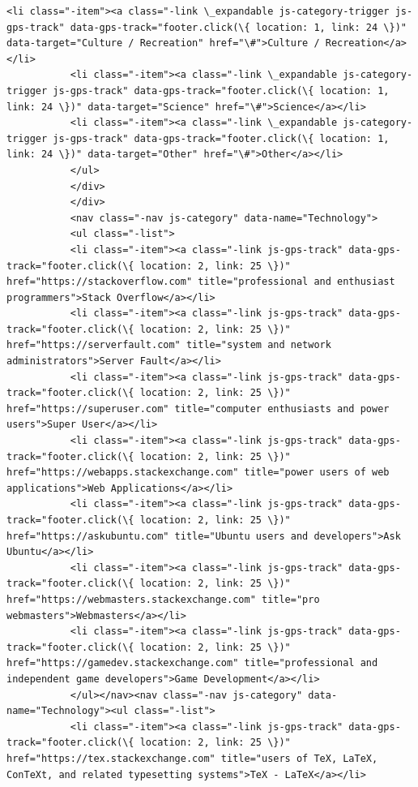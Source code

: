 \documentclass[11pt]{article}
\begin{document}
\begin{Verbatim}[commandchars=\\\{\}]
           <li class="-item"><a class="-link \_expandable js-category-trigger js-gps-track" data-gps-track="footer.click(\{ location: 1, link: 24 \})" data-target="Culture / Recreation" href="\#">Culture / Recreation</a></li>
           <li class="-item"><a class="-link \_expandable js-category-trigger js-gps-track" data-gps-track="footer.click(\{ location: 1, link: 24 \})" data-target="Science" href="\#">Science</a></li>
           <li class="-item"><a class="-link \_expandable js-category-trigger js-gps-track" data-gps-track="footer.click(\{ location: 1, link: 24 \})" data-target="Other" href="\#">Other</a></li>
           </ul>
           </div>
           </div>
           <nav class="-nav js-category" data-name="Technology">
           <ul class="-list">
           <li class="-item"><a class="-link js-gps-track" data-gps-track="footer.click(\{ location: 2, link: 25 \})" href="https://stackoverflow.com" title="professional and enthusiast programmers">Stack Overflow</a></li>
           <li class="-item"><a class="-link js-gps-track" data-gps-track="footer.click(\{ location: 2, link: 25 \})" href="https://serverfault.com" title="system and network administrators">Server Fault</a></li>
           <li class="-item"><a class="-link js-gps-track" data-gps-track="footer.click(\{ location: 2, link: 25 \})" href="https://superuser.com" title="computer enthusiasts and power users">Super User</a></li>
           <li class="-item"><a class="-link js-gps-track" data-gps-track="footer.click(\{ location: 2, link: 25 \})" href="https://webapps.stackexchange.com" title="power users of web applications">Web Applications</a></li>
           <li class="-item"><a class="-link js-gps-track" data-gps-track="footer.click(\{ location: 2, link: 25 \})" href="https://askubuntu.com" title="Ubuntu users and developers">Ask Ubuntu</a></li>
           <li class="-item"><a class="-link js-gps-track" data-gps-track="footer.click(\{ location: 2, link: 25 \})" href="https://webmasters.stackexchange.com" title="pro webmasters">Webmasters</a></li>
           <li class="-item"><a class="-link js-gps-track" data-gps-track="footer.click(\{ location: 2, link: 25 \})" href="https://gamedev.stackexchange.com" title="professional and independent game developers">Game Development</a></li>
           </ul></nav><nav class="-nav js-category" data-name="Technology"><ul class="-list">
           <li class="-item"><a class="-link js-gps-track" data-gps-track="footer.click(\{ location: 2, link: 25 \})" href="https://tex.stackexchange.com" title="users of TeX, LaTeX, ConTeXt, and related typesetting systems">TeX - LaTeX</a></li>

\end{Verbatim}
\end{document}

